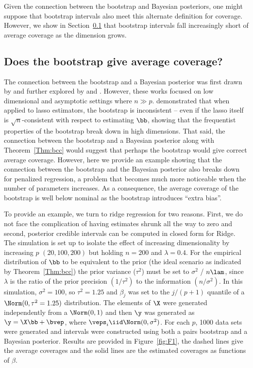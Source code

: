 Given the connection between the bootstrap and Bayesian posteriors, one might suppose that bootstrap intervals also meet this alternate definition for coverage. However, we show in Section~\ref{Sec:boot-bias} that bootstrap intervals fall increasingly short of average coverage as the dimension grows.

\subsection{Does the bootstrap give average coverage?}
\label{Sec:boot-bias}

The connection between the bootstrap and a Bayesian posterior was first drawn by \cite{Rubin1981} and further explored by \cite{efron1982} and \cite{Lo1987}. However, these works focused on low dimensional and asymptotic settings where $n \gg p$. \cite{Chatterjee2010} demonstrated that when applied to lasso estimators, the bootstrap is inconsistent -- even if the lasso itself is $\sqrt{n}$-consistent with respect to estimating $\bb$, showing that the frequentist properties of the bootstrap break down in high dimensions. That said, the connection between the bootstrap and a Bayesian posterior along with Theorem~\ref{Thm:bcc} would suggest that perhaps the bootstrap would give correct average coverage. However, here we provide an example showing that the connection between the bootstrap and the Bayesian posterior also breaks down for penalized regression, a problem that becomes much more noticeable when the number of parameters increases. As a consequence, the average coverage of the bootstrap is well below nominal as the bootstrap introduces ``extra bias''.

To provide an example, we turn to ridge regression for two reasons. First, we do not face the complication of having estimates shrunk all the way to zero and second, posterior credible intervals can be computed in closed form for Ridge. The simulation is set up to isolate the effect of increasing dimensionality by increasing $p$ $(20, 100, 200)$ but holding $n = 200$ and $\lambda = 0.4$. For the empirical distribution of $\bb$ to be equivalent to the prior (the ideal scenario as indicated by Theorem~\ref{Thm:bcc}) the prior variance ($\tau^2$) must be set to $\sigma^2$ / $n\lam$, since $\lambda$ is the ratio of the prior precision $(1/\tau^2)$ to the information $(n / \sigma^2)$. In this simulation, $\sigma^2 = 100$, so $\tau^2 = 1.25$ and $\beta_j$ was set to the $j/(p+1)$ quantile of a $\Norm(0,\tau^2=1.25)$ distribution. The elements of $\X$ were generated independently from a $\Norm(0, 1)$ and then $\y$ was generated as $\y = \X\bb + \bvep$, where $\veps_i \iid \Norm(0, \sigma^2)$. For each $p$, 1000 data sets were generated and intervals were constructed using both a pairs bootstrap and a Bayesian posterior. Results are provided in Figure~\ref{fig:F1}, the dashed lines give the average coverages and the solid lines are the estimated coverages as functions of $\beta$.


